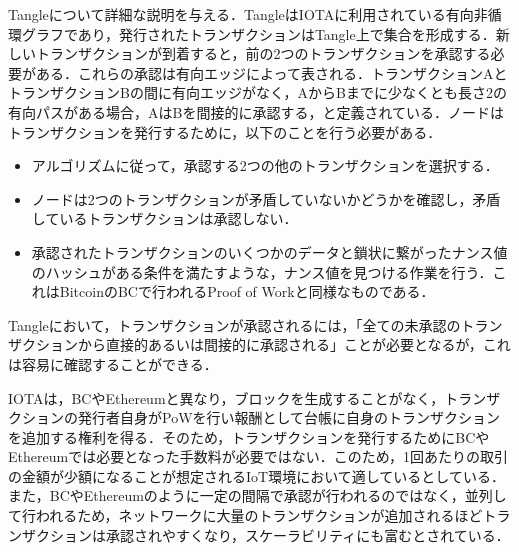 \documentclass[japanese, macos]{KU2}
\begin{document}
Tangleについて詳細な説明を与える．TangleはIOTAに利用されている有向非循環グラフであり，発行されたトランザクションはTangle上で集合を形成する．新しいトランザクションが到着すると，前の2つのトランザクションを承認する必要がある．これらの承認は有向エッジによって表される．トランザクションAとトランザクションBの間に有向エッジがなく，AからBまでに少なくとも長さ2の有向パスがある場合，AはBを間接的に承認する，と定義されている．ノードはトランザクションを発行するために，以下のことを行う必要がある．
\begin{itemize}
\item アルゴリズムに従って，承認する2つの他のトランザクションを選択する．
\item ノードは2つのトランザクションが矛盾していないかどうかを確認し，矛盾しているトランザクションは承認しない．
\item 承認されたトランザクションのいくつかのデータと鎖状に繋がったナンス値のハッシュがある条件を満たすような，ナンス値を見つける作業を行う．これはBitcoinのBCで行われるProof of Workと同様なものである．
\end{itemize}
Tangleにおいて，トランザクションが承認されるには，「全ての未承認のトランザクションから直接的あるいは間接的に承認される」ことが必要となるが，これは容易に確認することができる．

IOTAは，BCやEthereumと異なり，ブロックを生成することがなく，トランザクションの発行者自身がPoWを行い報酬として台帳に自身のトランザクションを追加する権利を得る．そのため，トランザクションを発行するためにBCやEthereumでは必要となった手数料が必要ではない．このため，1回あたりの取引の金額が少額になることが想定されるIoT環境において適しているとしている．また，BCやEthereumのように一定の間隔で承認が行われるのではなく，並列して行われるため，ネットワークに大量のトランザクションが追加されるほどトランザクションは承認されやすくなり，スケーラビリティにも富むとされている．
\end{document}
